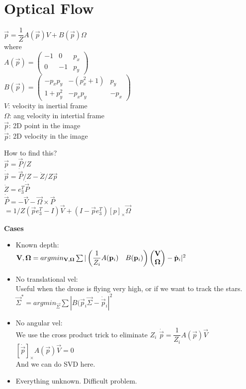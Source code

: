 \section{Optical Flow}
$\vec{p} = \dfrac{1}{Z} A(\vec{p}) V + B(\vec{p}) \Omega$\\
where \\
$A(\vec{p}) = \begin{pmatrix}
  -1 & 0 & p_x \\ 0 & -1 & p_y
\end{pmatrix}$\\
$B(\vec{p}) = \begin{pmatrix}
  -p_x p_y & -(p_x^2 +1) & p_y \\
  1 + p_y^2 & -p_x p_y & -p_x
\end{pmatrix}$\\
$V$: velocity in \alert{inertial frame}\\
$\Omega$: ang velocity in \alert{intertial frame}\\
$\vec{p}$: 2D point in the image \\
$\dot{\vec{p}}$: 2D velocity in the image

How to find this?\\
$\vec{p} = \vec{P}/Z$\\
$\dot{\vec{p}} = \dot{\vec{P}}/Z - \dot{Z}/Z \vec{p}$\\
$\dot{Z} = e_3^T \dot{\vec{P}}$\\
$\dot{\vec{P}} = - \vec{V} - \vec{\Omega} \times \vec{P}$\\
$=1/Z ( \vec{p} e_3^T - I) \vec{V} + (I - \vec{p} e_3^T)[p]_\times
\vec{\Omega}$

\textbf{Cases}
\begin{itemize}
  \item Known depth:\\
    $\vec{V}, \vec{\Omega} = argmin_{\vec{V}, \vec{\Omega}}\\
    \sum |\begin{pmatrix} \dfrac{1}{Z_i} A(\vec{p}_i) &
    B(\vec{p}_i)\end{pmatrix} 
    \begin{pmatrix}
      \vec{V}\\\vec{\Omega}
    \end{pmatrix} - \dot{\vec{p}}_i|^2$
  \item No translational vel:\\
    \alert{Useful when the drone is flying very high, or if we want to
    track the stars}.\\
    $\vec{\Sigma}^* = argmin_{\vec{\Sigma}}
    \sum |B(\vec{p}_i \vec{\Sigma} - \dot{\vec{p}}_i|^2$
  \item No angular vel:\\
    \alert{We use the cross product trick to eliminate $Z_i$}
    $\dot{\vec{p}} = \dfrac{1}{Z_i} A(\vec{p}) \vec{V}$\\
    $[\dot{\vec{p}}]_{\times} A(\vec{p}) \vec{V} = 0$\\
    And we can do SVD here.
  \item Everything unknown. Difficult problem.
\end{itemize}


